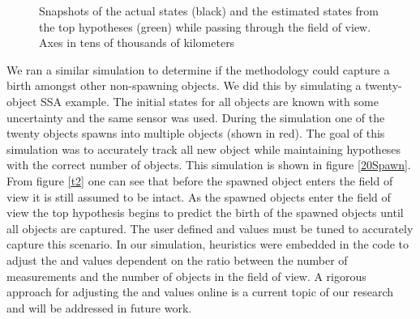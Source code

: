 \documentclass[10pt, conference]{IEEEtran}
\begin{document}
\begin{figure}[H]
\centering
{}

\end{figure}

\begin{figure}[H]
\centering
{}


\caption{Snapshots of the actual states (black) and the estimated states from the top hypotheses (green) while passing through the field of view. Axes in tens of thousands of kilometers}
\label{rs}
\end{figure}
We ran a similar simulation to determine if the methodology could capture a birth amongst other non-spawning objects. We did this by simulating a twenty-object SSA example. The initial states for all objects are known with some uncertainty and the same sensor was used. During the simulation one of the twenty objects spawns into multiple objects (shown in red). The goal of this simulation was to accurately track all new object while maintaining hypotheses with the correct number of objects. This simulation is shown in figure \ref{20Spawn}. From figure \ref{t2} one can see that before the spawned object enters the field of view it is still assumed to be intact. As the spawned objects enter the field of view the top hypothesis begins to predict the birth of the spawned objects until all objects are captured. The user defined  and  values must be tuned to accurately capture this scenario. In our simulation, heuristics were embedded in the code to adjust the  and  values dependent on the ratio between the number of measurements and the number of objects in the field of view. A rigorous approach for adjusting the  and  values online is a current topic of our research and will be addressed in future work. 

\begin{figure}[H]
\centering
{}

\end{figure}
\end{document}
